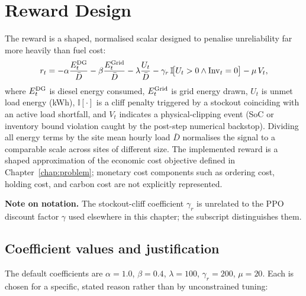 \section{Reward Design}
\label{sec:reward_design}

The reward is a shaped, normalised scalar designed to penalise
unreliability far more heavily than fuel cost:
\[
r_t =
-\alpha \dfrac{E_t^{\mathrm{DG}}}{\bar{D}}
-\beta  \dfrac{E_t^{\mathrm{Grid}}}{\bar{D}}
-\lambda \dfrac{U_t}{\bar{D}}
-\gamma_r\,\mathbb{I}\!\bigl[U_t>0 \wedge \mathrm{Inv}_t=0\bigr]
-\mu\,V_t,
\]
where $E_t^{\mathrm{DG}}$ is diesel energy consumed, $E_t^{\mathrm{Grid}}$ is grid energy
drawn, $U_t$ is unmet load energy (kWh), $\mathbb{I}[\cdot]$ is a cliff
penalty triggered by a stockout coinciding with an active load shortfall,
and $V_t$ indicates a physical-clipping event (SoC or inventory bound
violation caught by the post-step numerical backstop). Dividing all
energy terms by the site mean hourly load $\bar{D}$ normalises the signal
to a comparable scale across sites of different size. The implemented
reward is a shaped approximation of the economic cost objective defined
in Chapter~\ref{chap:problem}; monetary cost components such as ordering
cost, holding cost, and carbon cost are not explicitly represented.

\textbf{Note on notation.} The stockout-cliff coefficient $\gamma_r$ is
unrelated to the PPO discount factor $\gamma$ used elsewhere in this
chapter; the subscript distinguishes them.

\subsection{Coefficient values and justification}

The default coefficients are $\alpha=1.0$, $\beta=0.4$, $\lambda=100$,
$\gamma_r=200$, $\mu=20$. Each is chosen for a specific, stated reason
rather than by unconstrained tuning:

